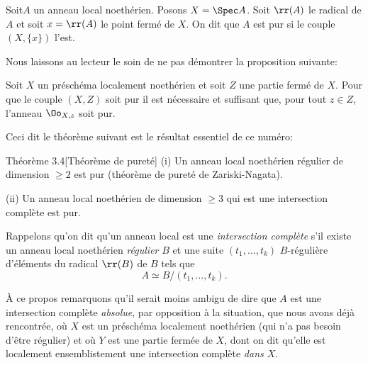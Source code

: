 \begin{definition} \label{X.3.2}
Soit\pageoriginale $A$ un anneau local noeth\'erien. Posons $X=\Spec A$. Soit $\rr(A)$ le radical de $A$ et soit $x=\rr(A)$ le point ferm\'e de $X$. On dit que $A$ est pur si le couple $(X, \{x\})$ l'est.
\end{definition}

Nous laissons au lecteur le soin de ne pas d\'emontrer la proposition suivante:

\begin{proposition} \label{X.3.3}
Soit $X$ un pr\'esch\'ema localement noeth\'erien et soit $Z$ une partie ferm\'e de $X$. Pour que le couple $(X, Z)$ soit pur il est n\'ecessaire et suffisant que, pour tout $z\in Z$, l'anneau $\Oo_{X, z}$ soit pur.
\end{proposition}

Ceci dit le th\'eor\`eme suivant est le r\'esultat essentiel de ce num\'ero:

\label{X.3.4}
\begin{enonce*}{Th\'eor\`eme 3.4}[Th\'eor\`eme de puret\'e\ndemark]
\textup{(i)}\enspace
Un anneau local noeth\'erien r\'egulier de dimension $\geq 2$ est pur (th\'eor\`eme de puret\'e de Zariski-Nagata).

\textup{(ii)}\enspace
Un anneau local noeth\'erien de dimension $\geq 3$ qui est une intersection compl\`ete est pur.
\end{enonce*}

Rappelons qu'on dit qu'un anneau local est une \emph{intersection compl\`ete} s'il existe un anneau local noeth\'erien \emph{r\'egulier} $B$ et une suite $(t_1, \ldots, t_k)$ $B$-r\'eguli\`ere d'\'el\'ements du radical $\rr(B)$ de $B$ tels que
\[
A \simeq B/(t_1, \ldots, t_k).
\]

À ce propos remarquons qu'il serait moins ambigu de dire que $A$ est une intersection compl\`ete \emph{absolue}, par opposition \`a la situation, que nous avons d\'ej\`a rencontr\'ee, o\`u $X$ est un pr\'esch\'ema localement noeth\'erien (qui n'a pas besoin d'\^etre r\'egulier) et o\`u $Y$ est une partie ferm\'ee de $X$, dont on dit qu'elle est \og localement ensemblistement une intersection compl\`ete \emph{dans $X$}\fg.

